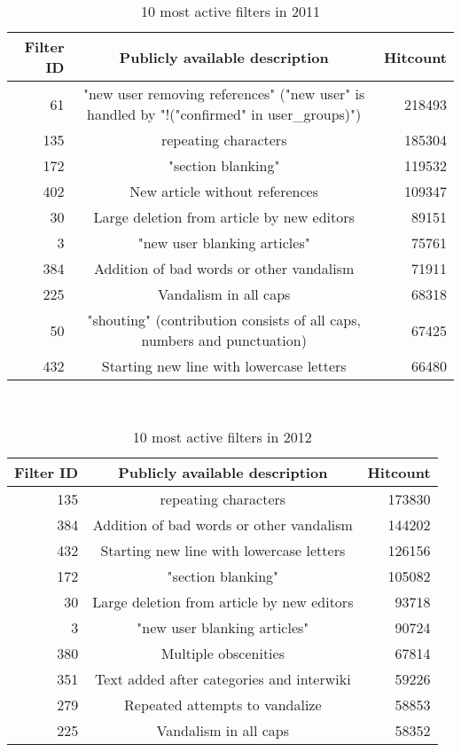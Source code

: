 \begin{table}
  \centering
  \begin{tabular}{r c r }
    Filter ID & Publicly available description & Hitcount \\
    \hline
    61 & "new user removing references" ("new user" is handled by "!("confirmed" in user\_groups)") & 218493 \\
    135 & repeating characters & 185304 \\
    172 & "section blanking" & 119532 \\
    402 & New article without references & 109347 \\
    30 & Large deletion from article by new editors & 89151 \\
    3 & "new user blanking articles" & 75761 \\
    384 & Addition of bad words or other vandalism & 71911 \\
    225 & Vandalism in all caps & 68318 \\
    50 & "shouting" (contribution consists of all caps, numbers and punctuation) & 67425 \\
    432 & Starting new line with lowercase letters & 66480 \\
  \end{tabular}
  \caption{10 most active filters in 2011}~\label{tab:most-active-2011}
\end{table}

\begin{table}
  \centering
  \begin{tabular}{r c r }
    Filter ID & Publicly available description & Hitcount \\
    \hline
    135 & repeating characters & 173830 \\
    384 & Addition of bad words or other vandalism & 144202 \\
    432 & Starting new line with lowercase letters & 126156 \\
    172 & "section blanking" & 105082 \\
    30 & Large deletion from article by new editors & 93718 \\
    3 & "new user blanking articles" & 90724 \\
    380 & Multiple obscenities & 67814 \\
    351 & Text added after categories and interwiki & 59226 \\
    279 & Repeated attempts to vandalize & 58853 \\
    225 & Vandalism in all caps & 58352 \\
  \end{tabular}
  \caption{10 most active filters in 2012}~\label{tab:most-active-2012}
\end{table}

